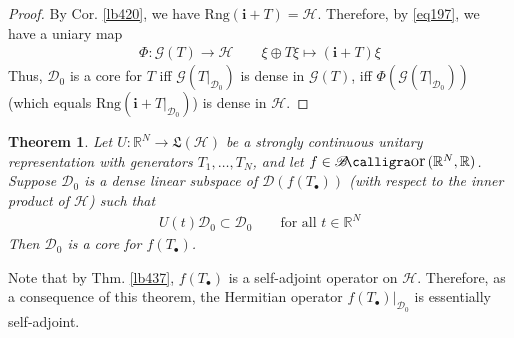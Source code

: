 \documentclass[12pt,b5paper,notitlepage]{article}
\theoremstyle{definition}
\theoremstyle{plain}
\newtheorem{thm}[df]{Theorem}
\DeclareMathOperator{\Bor}{\mathscr{B}\text{\kern -2pt {\calligra\large or}}\,}
\newcommand{\fk}{\mathfrak}
\newcommand{\Dom}{\mathscr{D}}
\newcommand{\im}{\mathbf{i}}
\newcommand{\blt}{\bullet}
\newcommand{\Rbb}{\mathbb R}
\newcommand{\Rng}{\mathrm{Rng}}
\newcommand{\MH}{\mathcal H}
\newcommand{\SG}{\mathscr G}
\numberwithin{equation}{section}
\begin{document}
\begin{proof}
By Cor. \ref{lb420}, we have $\Rng(\im+T)=\MH$. Therefore, by \eqref{eq197}, we have a uniary map
\begin{align*}
\Phi:\SG(T)\rightarrow \MH\qquad \xi\oplus T\xi\mapsto (\im+T)\xi
\end{align*}
Thus, $\Dom_0$ is a core for $T$ iff $\SG(T|_{\Dom_0})$ is dense in $\SG(T)$, iff $\Phi(\SG(T|_{\Dom_0}))$ (which equals $\Rng(\im+T|_{\Dom_0})$) is dense in $\MH$.
\end{proof}



\begin{thm}\label{lb534}
Let $U:\Rbb^N\rightarrow\fk L(\MH)$ be a strongly continuous unitary representation with generators $T_1,\dots,T_N$, and let $f\in\Bor(\Rbb^N,\Rbb)$. Suppose $\Dom_0$ is a dense linear subspace of $\Dom(f(T_\blt))$ (with respect to the inner product of $\MH$) such that 
\begin{align}\label{eq260}
U(t)\Dom_0\subset\Dom_0\qquad\text{for all }t\in\Rbb^N
\end{align}
Then $\Dom_0$ is a core for $f(T_\blt)$.
\end{thm}


Note that by Thm. \ref{lb437}, $f(T_\blt)$ is a self-adjoint operator on $\MH$. Therefore, as a consequence of this theorem, the Hermitian operator $f(T_\blt)|_{\Dom_0}$ is essentially self-adjoint.
\end{document}
